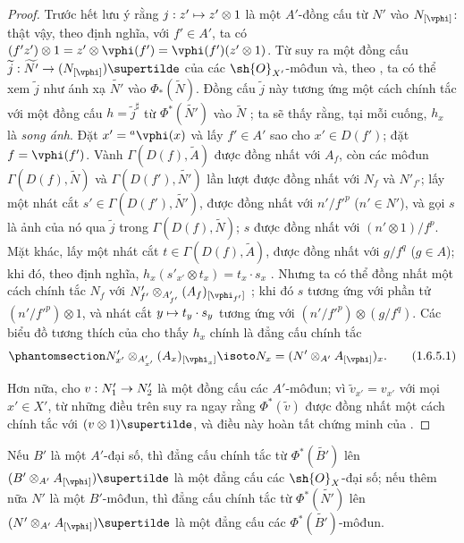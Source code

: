 \documentclass[oneside]{amsart}
\makeatletter
\newcommand{\ega@arrow}[2]{\mathchoice{#1}{#2}{#2}{#2}}
\let\ega@shortmapsto\mapsto
\renewcommand{\to}{\ega@arrow{\longrightarrow}{\rightarrow}}
\renewcommand{\mapsto}{\ega@arrow{\longmapsto}{\ega@shortmapsto}}
\let\EGAOriginalLabel\label
\renewcommand{\label}[1]{\phantomsection\EGAOriginalLabel{#1}}
\makeatother
\begin{document}
\begin{proof}
Trước hết lưu ý rằng $j:z'\mapsto z'\otimes 1$ là một $A'$-đồng cấu từ
$N'$ vào $N_{[\vphi]}$: thật vậy, theo định nghĩa, với $f'\in A'$, ta có
$(f' z')\otimes 1=z'\otimes\vphi(f')=\vphi(f')(z'\otimes 1)$.
Từ  suy ra một đồng cấu
$\widetilde{j}:\widetilde{N'}\to(N_{[\vphi]})\supertilde$ của các
$\sh{O}_{X'}$-môđun và, theo , ta có thể xem $\widetilde{j}$
như ánh xạ $\widetilde{N'}$ vào $\Phi_*(\widetilde{N})$.
Đồng cấu $\widetilde{j}$ này tương ứng một cách chính tắc với một đồng cấu
$h=\widetilde{j}^\sharp$ từ $\Phi^*(\widetilde{N'})$ vào $\widetilde{N}$
; ta sẽ thấy rằng, tại mỗi cuống, $h_x$ là \emph{song ánh}.
Đặt $x'={}^a\vphi(x)$ và lấy $f'\in A'$ sao cho $x'\in D(f')$; đặt
$f=\vphi(f')$.
Vành $\Gamma(D(f),\widetilde{A})$ được đồng nhất với $A_f$, còn các môđun
$\Gamma(D(f),\widetilde{N})$ và $\Gamma(D(f'),\widetilde{N'})$ lần lượt
được đồng nhất với $N_f$ và $N'_{f'}$; lấy một nhát cắt
$s'\in\Gamma(D(f'),\widetilde{N'})$, được đồng nhất với $n'/{f'}^p$
($n'\in N'$), và gọi $s$ là ảnh của nó qua $\widetilde{j}$ trong
$\Gamma(D(f),\widetilde{N})$; $s$ được đồng nhất với $(n'\otimes 1)/f^p$.
Mặt khác, lấy một nhát cắt $t\in\Gamma(D(f),\widetilde{A})$, được đồng nhất
với $g/f^q$ ($g\in A$); khi đó, theo định nghĩa,
$h_x(s'_{x'}\otimes t_x)=t_x\cdot s_x$ .
Nhưng ta có thể đồng nhất một cách chính tắc $N_f$ với
$N'_{f'}\otimes_{A'_{f'}}(A_f)_{[\vphi_{f'}]}$ ; khi đó
$s$ tương ứng với phần tử $(n'/{f'}^p)\otimes 1$, và nhát cắt
$y\mapsto t_y\cdot s_y$ tương ứng với $(n'/{f'}^p)\otimes(g/f^q)$.
Các biểu đồ tương thích của  cho thấy $h_x$ chính là đẳng
cấu chính tắc
\[
  \label{I.1.6.5.1}
  N'_{x'}\otimes_{A'_{x'}}(A_x)_{[\vphi_x]}\isoto
  N_x=(N'\otimes_{A'}A_{[\vphi]})_x.
  \tag{1.6.5.1}
\]

Hơn nữa, cho $v:N_1'\to N_2'$ là một đồng cấu các $A'$-môđun; vì
$\widetilde{v}_{x'}=v_{x'}$ với mọi $x'\in X'$, từ những điều trên suy ra
ngay rằng $\Phi^*(\widetilde{v})$ được đồng nhất một cách chính tắc với
$(v\otimes 1)\supertilde$, và điều này hoàn tất chứng minh của
.
\end{proof}

Nếu $B'$ là một $A'$-đại số, thì đẳng cấu chính tắc từ
$\Phi^*(\widetilde{B'})$ lên
$(B'\otimes_{A'}A_{[\vphi]})\supertilde$ là một đẳng cấu các
$\sh{O}_X$-đại số; nếu thêm nữa $N'$ là một $B'$-môđun, thì đẳng cấu chính
tắc từ $\Phi^*(\widetilde{N'})$ lên
$(N'\otimes_{A'}A_{[\vphi]})\supertilde$ là một đẳng cấu các
$\Phi^*(\widetilde{B'})$-môđun.
\end{document}
